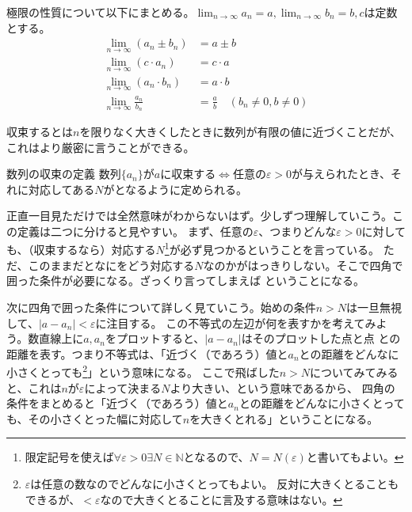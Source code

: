 \documentclass[a4j,dvipdfmx]{jsarticle}
\begin{document}
                極限の性質について以下にまとめる。$\displaystyle\lim_{n\to\infty}a_n=a,\lim_{n\to\infty}b_n=b,cは定数$とする。
                \begin{align}
                    \lim_{n\to\infty}(a_n\pm b_n)&=a\pm b\\
                    \lim_{n\to\infty}(c\cdot a_n)&=c\cdot a\\
                    \lim_{n\to\infty}(a_n\cdot b_n)&=a\cdot b\\
                    \lim_{n\to\infty}\frac{a_n}{b_n}&=\frac{a}{b}\quad(b_n\neq 0,b\neq 0)
                \end{align}

                収束するとは$n$を限りなく大きくしたときに数列が有限の値に近づくことだが、これはより厳密に言うことができる。
                \begin{itembox}{数列の収束の定義}
                    数列$\{a_n\}$が$a$に収束する$\Leftrightarrow $任意の$\varepsilon>0$が与えられたとき、それに対応してある$N$がとなるように定められる。
                \end{itembox}
                正直一目見ただけでは全然意味がわからないはず。少しずつ理解していこう。この定義は二つに分けると見やすい。
                まず、任意の$\varepsilon$、つまりどんな$\varepsilon>0$に対しても、（収束するなら）対応する$N$\footnote{限定記号を使えば$\forall \varepsilon>0\exists N\in\mathbb{N}$となるので、$N=N(\varepsilon)$と書いてもよい。}が必ず見つかるということを言っている。
                ただ、このままだとなにをどう対応する$N$なのかがはっきりしない。そこで四角で囲った条件が必要になる。ざっくり言ってしまえば
                ということになる。

                次に四角で囲った条件について詳しく見ていこう。始めの条件$n>N$は一旦無視して、$|a-a_n|<\varepsilon$に注目する。
                この不等式の左辺が何を表すかを考えてみよう。数直線上に$a,a_n$をプロットすると、$|a-a_n|$はそのプロットした点と点
                との距離を表す。つまり不等式は、「近づく（であろう）値と$a_n$との距離をどんなに小さくとっても\footnote{$\varepsilon$は任意の数なのでどんなに小さくとってもよい。
                反対に大きくとることもできるが、$<\varepsilon$なので大きくとることに言及する意味はない。}」という意味になる。
                ここで飛ばした$n>N$についてみてみると、これは$n$が$\varepsilon$によって決まる$N$より大きい、という意味であるから、
                四角の条件をまとめると「近づく（であろう）値と$a_n$との距離をどんなに小さくとっても、その小さくとった幅に対応して$n$を大きくとれる」ということになる。\\
\end{document}
